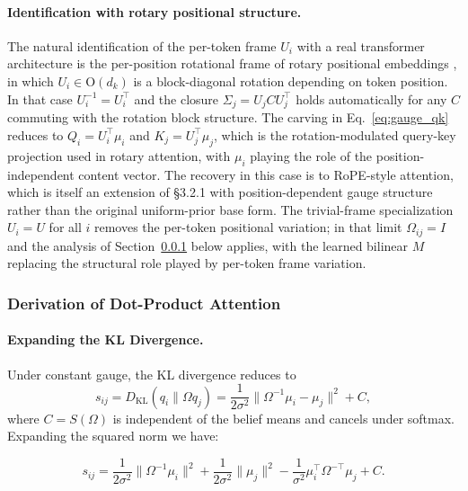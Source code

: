 \documentclass[twoside,11pt]{article}
\begin{document}
\paragraph{Identification with rotary positional structure.}
The natural identification of the per-token frame $U_i$ with a real transformer architecture is the per-position rotational frame of rotary positional embeddings \citep{su2024roformer}, in which $U_i \in \mathrm{O}(d_k)$ is a block-diagonal rotation depending on token position. In that case $U_i^{-1} = U_i^\top$ and the closure $\Sigma_j = U_j C U_j^\top$ holds automatically for any $C$ commuting with the rotation block structure. The carving in Eq.~\eqref{eq:gauge_qk} reduces to $Q_i = U_i^\top\mu_i$ and $K_j = U_j^\top\mu_j$, which is the rotation-modulated query-key projection used in rotary attention, with $\mu_i$ playing the role of the position-independent content vector. The recovery in this case is to RoPE-style attention, which is itself an extension of \citet{vaswani2017attention} \S3.2.1 with position-dependent gauge structure rather than the original uniform-prior base form. The trivial-frame specialization $U_i = U$ for all $i$ removes the per-token positional variation; in that limit $\Omega_{ij} = I$ and the analysis of Section~\ref{sec:dot_product_derivation} below applies, with the learned bilinear $M$ replacing the structural role played by per-token frame variation.

\subsubsection{Derivation of Dot-Product Attention}
\label{sec:dot_product_derivation}

\paragraph{Expanding the KL Divergence.}

Under constant gauge, the KL divergence reduces to
\begin{equation}
s_{ij} = D_{\mathrm{KL}}(q_i \| \Omega q_j) = \frac{1}{2\sigma^2}\|\Omega^{-1}\mu_i - \mu_j\|^2 + C,
\end{equation}
where $C = S(\Omega)$ is independent of the belief means and cancels under softmax. Expanding the squared norm we have:


\begin{equation}
s_{ij} = \frac{1}{2\sigma^2}\|\Omega^{-1}\mu_i\|^2 + \frac{1}{2\sigma^2}\|\mu_j\|^2 - \frac{1}{\sigma^2}\mu_i^\top \Omega^{-\top}\mu_j + C.
\end{equation}
\end{document}
